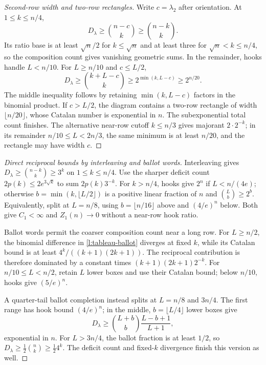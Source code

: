 \begin{proof}[Second-row width and two-row rectangles]
Write $c=\lambda_2$ after orientation. At $1\le k\le n/4$,
\[
 D_\lambda\ge\binom{n-c}k\ge\binom{n-k}k.
\]
Its ratio base is at least $\sqrt n/2$ for $k\le\sqrt n$
and at least three for $\sqrt n<k\le n/4$, so the composition
count gives vanishing geometric sums. In the remainder, hooks
handle $L<n/10$. For $L\ge n/10$ and $c\le L/2$,
\[
 D_\lambda\ge\binom{k+L-c}k
 \ge2^{\min(k,L-c)}\ge2^{n/20}.
\]
The middle inequality follows by retaining $\min(k,L-c)$ factors
in the binomial product. If $c>L/2$, the diagram contains a
two-row rectangle of width $\lfloor n/20\rfloor$, whose Catalan
number is exponential in $n$. The subexponential total count finishes.
The alternative near-row cutoff $k\le n/3$ gives majorant
$2\cdot2^{-k}$; in its remainder $n/10\le L<2n/3$,
the same minimum is at least $n/20$, and the rectangle may have width $c$.
\end{proof}

\begin{proof}[Direct reciprocal bounds by interleaving and ballot words]
Interleaving gives $D_\lambda\ge\binom{n-k}k\ge3^k$
on $1\le k\le n/4$. Use the sharper deficit count
$2p(k)\le2e^{3\sqrt k}$ to sum $2p(k)3^{-k}$.
For $k>n/4$, hooks give $2^n$ if $L<n/(4e)$; otherwise
$b=\min(k,\lfloor L/2\rfloor)$ is a positive linear fraction
of $n$ and $\binom Lb\ge2^b$. Equivalently, split at $L=n/8$,
using $b=\lfloor n/16\rfloor$ above and $(4/e)^n$ below.
Both give $C_1<\infty$ and $Z_1(n)\to0$ without a near-row hook ratio.

Ballot words permit the coarser composition count near a long row.
For $L\ge n/2$, the binomial difference in \eqref{l:tableau-ballot}
diverges at fixed $k$, while its Catalan bound is at least
$4^k/((k+1)(2k+1))$. The reciprocal contribution is therefore
dominated by a constant times $(k+1)(2k+1)2^{-k}$.
For $n/10\le L<n/2$, retain $L$ lower boxes and use their Catalan
bound; below $n/10$, hooks give $(5/e)^n$.

A quarter-tail ballot completion instead splits at $L=n/8$ and
$3n/4$. The first range has hook bound $(4/e)^n$; in the middle,
$b=\lfloor L/4\rfloor$ lower boxes give
\[
 D_\lambda\ge\binom{L+b}b\frac{L-b+1}{L+1},
\]
exponential in $n$. For $L>3n/4$, the ballot fraction is at least
$1/2$, so $D_\lambda\ge\frac12\binom nk\ge\frac12 4^k$.
The deficit count and fixed-$k$ divergence finish this version as well.
\end{proof}

